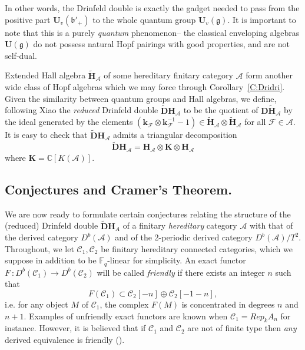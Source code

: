 \documentclass[a4paper,10pt]{amsart}
\def\H{\mathbf{H}}
\def\U{\mathbf{U}}
\def\C{\mathbb{C}}
\def\A{\mathcal{A}}
\def\g{\mathfrak{g}}
\def\bo{\mathfrak{b}}
\numberwithin{equation}{section}
\begin{document}
{\vspace{.1in}

In other words, the Drinfeld double is exactly the gadget needed to pass from the positive part
$\U_v(\bo'_+)$ to the whole quantum group $\U_v(\g)$. It is important to note that this is a purely \textit{quantum} phenomenon-- the classical enveloping algebras $\U(\g)$ do not possess natural Hopf pairings with good properties, and are not self-dual.

\vspace{.1in}

Extended Hall algebra $\widetilde{\H}_{\A}$ of some hereditary finitary category $\A$ form another wide class of Hopf algebras which we may force through Corollary~\ref{C:Dridri}. Given the similarity between quantum groups and Hall algebras, we define, following Xiao \cite{Xiao1} the \textit{reduced} Drinfeld double $\widetilde{\mathbf{D}}{\H}_{\A}$ to be the quotient of $\mathbf{D}\widetilde{\H}_{\A}$ by the ideal generated by the elements $(\mathbf{k}_{\mathcal{F}} \otimes \mathbf{k}_{\mathcal{F}}^{-1}-1) \in \widetilde{\H}_\A \otimes \widetilde{\H}_{\A}$ for all $\mathcal{F} \in \A$. It is easy to check that $\widetilde{\mathbf{D}}\H_{\A}$ admits a triangular decomposition
$$\widetilde{\mathbf{D}}\H_{\A}=\H_{\A} \otimes \mathbf{K}  \otimes \H_{\A}$$
where $\mathbf{K}=\C[K(\A)]$.

\vspace{.2in}

\subsection{Conjectures and Cramer's Theorem.}

\vspace{.2in}

We are now ready to formulate certain conjectures relating the structure of the (reduced) Drinfeld double $\widetilde{\mathbf{D}}{\H}_A$ of a finitary \textit{hereditary} category $\A$ with that of the derived category $D^b(\A)$ and of the 2-periodic derived category $D^b(\A)/T^2$. Throughout, we let $\mathcal{C}_1, \mathcal{C}_2$ be finitary hereditary connected categories, which we suppose in addition to be $\mathbb{F}_q$-linear for simplicity. An exact functor $F~:D^b(\mathcal{C}_1) \to D^b(\mathcal{C}_2)$ will be called \textit{friendly} if there exists an integer $n$ such that
$$F(\mathcal{C}_1) \subset \mathcal{C}_2[-n] \oplus \mathcal{C}_2[-1-n],$$
i.e. for any object $M$ of $\mathcal{C}_1$, the complex $F(M)$ is concentrated in degrees $n$ and $n+1$. Examples of unfriendly exact functors are known when $\mathcal{C}_1=Rep_kA_n$ for instance. However, it is believed that if $\mathcal{C}_1$ and $\mathcal{C}_2$ are not of finite type then \textit{any} derived equivalence is friendly (\cite{Lenzingoral}).

}
\end{document}
